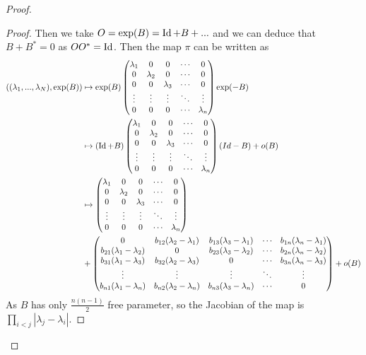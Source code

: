 \begin{proof}
\begin{proof}
        Then we take $O = \exp(B) = \operatorname{Id} + B + ...$ and we can deduce that $B + B^* = 0$ as $OO^* = \operatorname{Id}$. Then the map $\pi$ can be written as
        \begin{align*}
        \left((\lambda_1,...,\lambda_N), \exp(B)\right)
        &\mapsto \exp(B)
        \begin{pmatrix}
        \lambda_1 & 0 & 0 & \cdots & 0 \\
        0 & \lambda_2 & 0 & \cdots & 0 \\
        0 & 0 & \lambda_3 & \cdots & 0 \\
        \vdots & \vdots & \vdots & \ddots & \vdots \\
        0 & 0 & 0 & \cdots & \lambda_n
        \end{pmatrix}
        \exp(-B)\\
        &\mapsto (\operatorname{Id}+B)
        \begin{pmatrix}
        \lambda_1 & 0 & 0 & \cdots & 0 \\
        0 & \lambda_2 & 0 & \cdots & 0 \\
        0 & 0 & \lambda_3 & \cdots & 0 \\
        \vdots & \vdots & \vdots & \ddots & \vdots \\
        0 & 0 & 0 & \cdots & \lambda_n
        \end{pmatrix}
        (Id-B) + o(B)\\
        &\mapsto 
        \begin{pmatrix}
        \lambda_1 & 0 & 0 & \cdots & 0 \\
        0 & \lambda_2 & 0 & \cdots & 0 \\
        0 & 0 & \lambda_3 & \cdots & 0 \\
        \vdots & \vdots & \vdots & \ddots & \vdots \\
        0 & 0 & 0 & \cdots & \lambda_n
        \end{pmatrix}\\
        &+
        \begin{pmatrix}
        0 & b_{12}(\lambda_2 - \lambda_1) & b_{13}(\lambda_3 - \lambda_1) & \cdots & b_{1n}(\lambda_n - \lambda_1) \\
        b_{21}(\lambda_1 - \lambda_2) & 0 & b_{23}(\lambda_3 - \lambda_2) & \cdots & b_{2n}(\lambda_n - \lambda_2) \\
        b_{31}(\lambda_1 - \lambda_3) & b_{32}(\lambda_2 - \lambda_3) & 0 & \cdots & b_{3n}(\lambda_n - \lambda_3) \\
        \vdots & \vdots & \vdots & \ddots & \vdots \\
        b_{n1}(\lambda_1 - \lambda_n) & b_{n2}(\lambda_2 - \lambda_n) & b_{n3}(\lambda_3 - \lambda_n) & \cdots & 0
        \end{pmatrix}
        + o(B)
        \end{align*}
        As $B$ has only $\frac{n(n-1)}{2}$ free parameter, so the Jacobian of the map is $\prod_{i<j}|\lambda_j-\lambda_i|$.
    \end{proof}
    

\end{proof}
